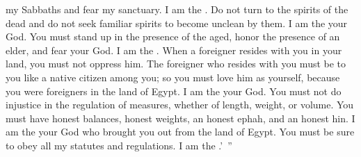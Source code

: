 {my Sabbaths
and fear
my sanctuary.
I am
the {}.
Do not
turn
to
the spirits
of the dead and do not
seek
familiar spirits
to become unclean
by them. I am
the {}
your God.
You must stand up
in the presence
of the aged,
honor
the presence
of an elder,
and fear
your God.
I
am the
{}.
When
a foreigner
resides
with
you in your land,
you must not
oppress him.
The foreigner
who resides
with
you must be to you like a native citizen
among
you; so you must love
him as yourself,
because
you were foreigners
in the land
of Egypt.
I am
the {}
your God.
You must not
do
injustice
in the regulation
of measures,
whether of length, weight,
or volume.
You must have honest
balances,
honest
weights,
an honest
ephah,
and an honest
hin.
I am
the {}
your God
who
brought you out
from the land
of Egypt.
You must be sure to obey
all
my statutes
and regulations.
I am
the {}.’ ”

}
